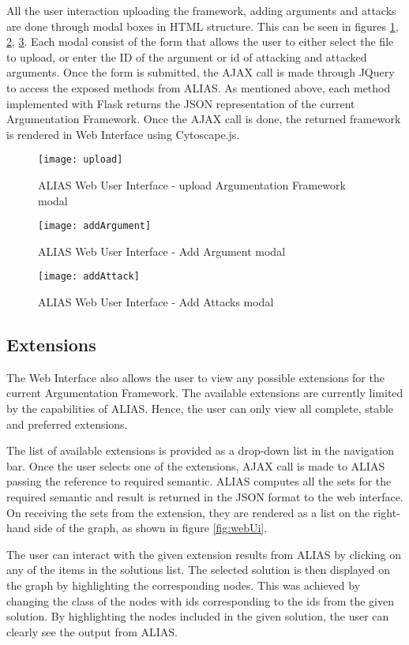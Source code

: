 All the user interaction uploading the framework, adding arguments and attacks are done through modal boxes in HTML structure. This can be seen in figures \ref{fig:upload}, \ref{fig:addArgument}, \ref{fig:addAttacks}. Each modal consist of the form that allows the user to either select the file to upload, or enter the ID of the argument or id of attacking and attacked arguments. Once the form is submitted, the AJAX call is made through JQuery to access the exposed methods from ALIAS. As mentioned above, each method implemented with Flask returns the JSON representation of the current Argumentation Framework. Once the AJAX call is done, the returned framework is rendered in Web Interface using Cytoscape.js.

\begin{figure}[!ht]
	\centering
	\texttt{[image: upload]}
	\caption{ALIAS Web User Interface - upload Argumentation Framework modal}
	\label{fig:upload}
\end{figure}

\begin{figure}[h]
	\centering
	\texttt{[image: addArgument]}
	\caption{ALIAS Web User Interface - Add Argument modal}
	\label{fig:addArgument}
\end{figure}

\begin{figure}[h]
	\centering
	\texttt{[image: addAttack]}
	\caption{ALIAS Web User Interface - Add Attacks modal}
	\label{fig:addAttacks}
\end{figure}

\subsection{Extensions}
The Web Interface also allows the user to view any possible extensions for the current Argumentation Framework. The available extensions are currently limited by the capabilities of ALIAS. Hence, the user can only view all complete, stable and preferred extensions. 

The list of available extensions is provided as a drop-down list in the navigation bar. Once the user selects one of the extensions, AJAX call is made to ALIAS passing the reference to required semantic. ALIAS computes all the sets for the required semantic and result is returned in the JSON format to the web interface. On receiving the sets from the extension, they are rendered as a list on the right-hand side of the graph, as shown in figure \ref{fig:webUi}.

The user can interact with the given extension results from ALIAS by clicking on any of the items in the solutions list. The selected solution is then displayed on the graph by highlighting the corresponding nodes. This was achieved by changing the class of the nodes with ids corresponding to the ids from the given solution. By highlighting the nodes included in the given solution, the user can clearly see the output from ALIAS.